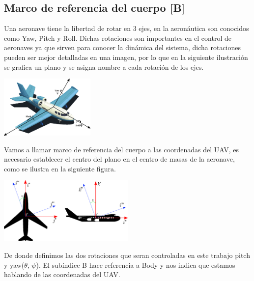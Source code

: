\subsection{Marco de referencia del cuerpo [B]}
Una aeronave tiene la libertad de rotar en 3 ejes, en la aeronáutica son conocidos como
Yaw, Pitch y Roll. Dichas rotaciones son importantes en el control de aeronaves ya
que sirven para conocer la dinámica del sistema, dicha rotaciones pueden ser mejor
detalladas en una imagen, por lo que en la siguiente ilustración se grafica un plano
y se asigna nombre a cada rotación de los ejes.
\begin{center}
	\includegraphics[width=0.35\textwidth]{Contenido/Cuerpo/Capitulo3/Fig6.eps}
	\label{fig:ModeloMat:Fig1}
\end{center}
Vamos a llamar marco de referencia del cuerpo a las coordenadas del UAV, es necesario establecer el centro del plano en el
centro de masas de la aeronave, como se ilustra en la siguiente figura.
\begin{center}
	\includegraphics[width=0.5\textwidth]{Contenido/Cuerpo/Capitulo3/Fig5.eps}
	\label{fig:ModeloMat:Fig1}
\end{center}
De donde definimos las dos rotaciones que seran controladas en este trabajo pitch y yaw($\theta$, $\psi$). El subíndice B hace referencia
a Body y nos indica que estamos hablando de las coordenadas del UAV.

